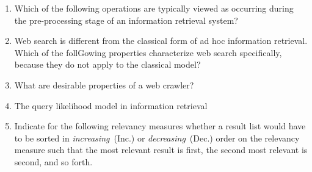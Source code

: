 \documentclass[exam, sectionseven, solution]{acAssignment}
\begin{document}
\begin{enumerate}
    \item Which of the following operations are typically viewed as occurring during the pre-processing stage of an information retrieval system?
        \begin{acMultipleChoice}
        \end{acMultipleChoice}
    
    \item Web search is different from the classical form of ad hoc information retrieval.
        Which of the follGowing properties characterize web search specifically, because they do not apply to the classical model?
        \begin{acMultipleChoice}
        \end{acMultipleChoice}
    
    \item What are desirable properties of a web crawler?
        \begin{acMultipleChoice}
        \end{acMultipleChoice}
    
    \item The query likelihood model in information retrieval\textellipsis
        \begin{acMultipleChoice}
        \end{acMultipleChoice}
    
    \item Indicate for the following relevancy measures whether a result list would have to be sorted in \emph{increasing}~(Inc.) or \emph{decreasing}~(Dec.) order on the relevancy measure such that the most relevant result is first, the second most relevant is second, and so forth.
        \begin{acMultipleChoice}
        \end{acMultipleChoice}
    

\end{enumerate}
\end{document}

